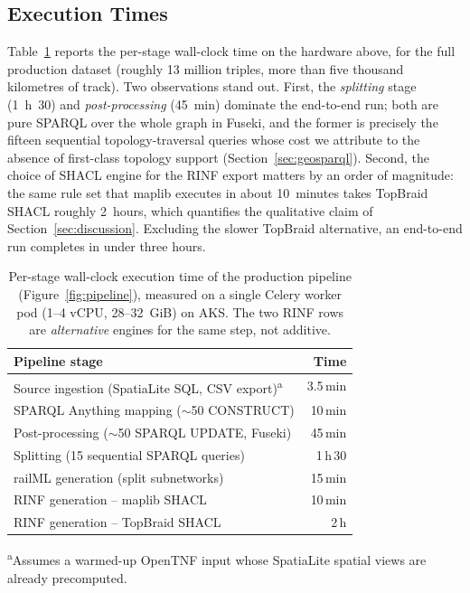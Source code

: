 \documentclass{ceurart}
\begin{document}
\subsection{Execution Times}

Table~\ref{tab:benchmark} reports the per-stage wall-clock time on the hardware
above, for the full production dataset (roughly 13 million triples, more than
five thousand kilometres of track). Two observations stand out. First, the
\emph{splitting} stage (1~h~30) and \emph{post-processing} (45~min) dominate the
end-to-end run; both are pure SPARQL over the whole graph in Fuseki, and the
former is precisely the fifteen sequential topology-traversal queries whose cost
we attribute to the absence of first-class topology support
(Section~\ref{sec:geosparql}). Second, the choice of SHACL engine for the RINF
export matters by an order of magnitude: the same rule set that maplib executes
in about 10~minutes takes TopBraid SHACL roughly 2~hours, which quantifies the
qualitative claim of Section~\ref{sec:discussion}. Excluding the slower TopBraid
alternative, an end-to-end run completes in under three hours.

\begin{table}[t]
  \centering
  \caption{Per-stage wall-clock execution time of the production pipeline
    (Figure~\ref{fig:pipeline}), measured on a single Celery worker pod (1--4
    vCPU, 28--32~GiB) on AKS. The two RINF rows are \emph{alternative} engines
    for the same step, not additive.}
  \label{tab:benchmark}
  \small
  \begin{tabularx}{\columnwidth}{@{}Xr@{}}
    \toprule
    \textbf{Pipeline stage} & \textbf{Time} \\
    \midrule
    Source ingestion (SpatiaLite SQL, CSV export)\textsuperscript{a} & 3.5\,min \\
    SPARQL Anything mapping ($\sim$50 CONSTRUCT) & 10\,min \\
    Post-processing ($\sim$50 SPARQL UPDATE, Fuseki) & 45\,min \\
    Splitting (15 sequential SPARQL queries) & 1\,h\,30 \\
    railML generation (split subnetworks) & 15\,min \\
    RINF generation -- maplib SHACL & 10\,min \\
    RINF generation -- TopBraid SHACL & 2\,h \\
    \bottomrule
  \end{tabularx}

  \smallskip
  {\footnotesize \textsuperscript{a}Assumes a warmed-up OpenTNF input whose
    SpatiaLite spatial views are already precomputed.\par}
\end{table}
\end{document}
